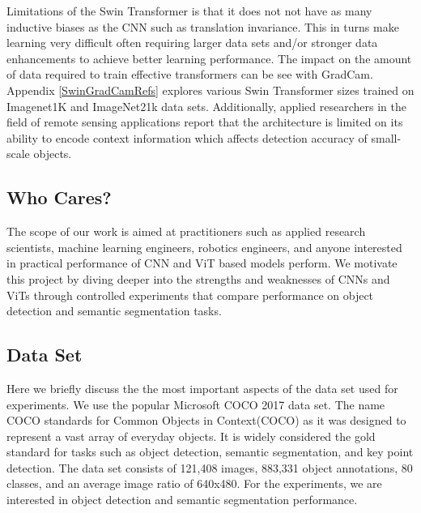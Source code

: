 \documentclass[10pt,twocolumn,letterpaper]{article}
\begin{document}
 Limitations of the Swin Transformer\cite{liu2021swin} is that it does not not have as many inductive biases as the CNN such as translation invariance. This in turns make learning very difficult often requiring larger data sets and/or stronger data enhancements to achieve better learning performance. The impact on the amount of data required to train effective transformers can be see with GradCam\cite{selvaraju2017grad}. Appendix \ref{SwinGradCamRefs} explores various Swin Transformer sizes trained on Imagenet1K\cite{krizhevsky2012imagenet} and ImageNet21k data sets. Additionally, applied researchers in the field of remote sensing applications\cite{xu2021improved} report that the architecture is limited on its ability to encode context information which affects detection accuracy of small-scale objects.


\subsection{Who Cares?}

The scope of our work is aimed at practitioners such as applied research scientists, machine learning engineers, robotics engineers, and anyone interested in practical performance of CNN and ViT based models perform. We motivate this project by diving deeper into the strengths and weaknesses of CNNs and ViTs through controlled experiments that compare performance on object detection and semantic segmentation tasks.

\subsection{Data Set}

Here we briefly discuss the the most important aspects\cite{gebru2021datasheets} of the data set used for experiments. We use the popular Microsoft COCO 2017 data set\cite{lin2014microsoft}. The name COCO standards for Common Objects in Context(COCO) as it was designed to represent a vast array of everyday objects. It is widely considered the gold standard for tasks such as object detection, semantic segmentation, and key point detection. The data set consists of 121,408 images, 883,331 object annotations, 80 classes, and an average image ratio of 640x480. For the experiments, we are interested in object detection and semantic segmentation performance.
\end{document}
